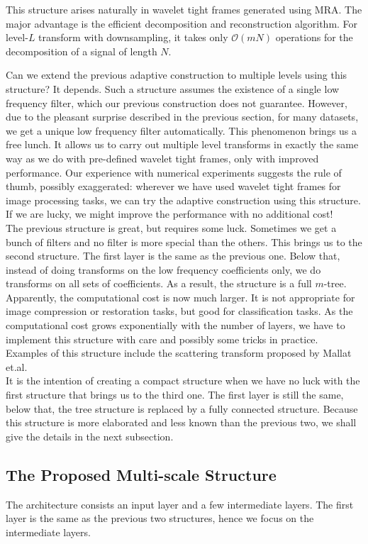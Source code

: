 This structure arises naturally in wavelet tight frames generated using MRA. The major advantage is the efficient decomposition and reconstruction algorithm. For level-$L$ transform with downsampling, it takes only $\mathcal O(mN)$ operations for the decomposition of a signal of length $N$.
 
Can we extend the previous adaptive construction to multiple levels using this structure? It depends. Such a structure assumes the existence of a single low frequency filter, which our previous construction does not guarantee. However, due to the pleasant surprise described in the previous section, for many datasets, we get a unique low frequency filter automatically. This phenomenon brings us a free lunch. It allows us to carry out multiple level transforms in exactly the same way as we do with pre-defined wavelet tight frames, only with improved performance. Our experience with numerical experiments suggests the rule of thumb, possibly exaggerated: {\color{red}wherever we have used wavelet tight frames for image processing tasks, we can try the adaptive construction using this structure. If we are lucky, we might improve the performance with no additional cost!} \\

The previous structure is great, but requires some luck. Sometimes we get a bunch of filters and no filter is more special than the others. This brings us to the second structure. The first layer is the same as the previous one. Below that, instead of doing transforms on the low frequency coefficients only, we do transforms on all sets of coefficients. As a result, the structure is a full $m$-tree. Apparently, the computational cost is now much larger. It is not appropriate for image compression or restoration tasks, but good for classification tasks. As the computational cost grows exponentially with the number of layers, we have to implement this structure with care and possibly some tricks in practice.  Examples of this structure include the scattering transform proposed by Mallat et.al. \\

It is the intention of creating a compact structure when we have no luck with the first structure that brings us to the third one. The first layer is still the same, below that, the tree structure is replaced by a fully connected structure. Because this structure is more elaborated and less known than the previous two, we shall give the details in the next subsection.

\subsection{The Proposed Multi-scale Structure}
The architecture consists an input layer and a few intermediate layers. The first layer is the same as the previous two structures, hence we focus on the intermediate layers. 

